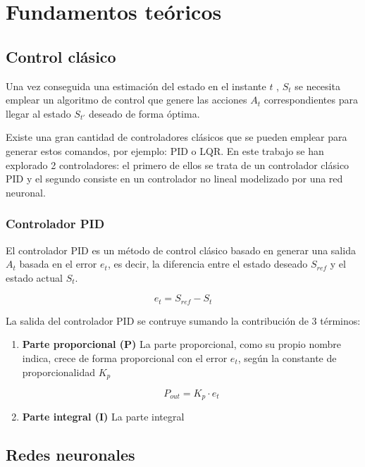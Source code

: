\chapter{Fundamentos teóricos}

\section{Control clásico}


Una vez conseguida una estimación del estado en el instante $t$ ,  $S_t$ se necesita emplear un algoritmo de control que genere	las acciones $A_t$ correspondientes para llegar al estado $S_{t'}$ deseado de forma óptima.




Existe una gran cantidad de controladores clásicos que se pueden emplear para generar estos comandos, por ejemplo: PID o LQR.
En este trabajo se han explorado 2 controladores: el primero de ellos se trata de un controlador clásico PID y el segundo consiste en un controlador no lineal modelizado por una red neuronal.

\subsection{Controlador PID}

El controlador PID es un método de control clásico basado en generar una salida $A_t$ basada en el error $e_t$, es decir, la diferencia entre el estado deseado $S_{ref}$ y el estado actual $S_t$.

\begin{equation}
e_t= S_{ref} - S_t
\end{equation}

La salida del controlador PID se contruye sumando la contribución de 3 términos:
\begin{enumerate}
	\item \textbf{Parte proporcional (P)}
	La parte proporcional, como su propio nombre indica, crece de forma proporcional con el error $e_t$, según la constante de proporcionalidad $K_p$
	
	\begin{equation}
	P_{out}=K_p \cdot e_t
	\end{equation} 
	\item \textbf{Parte integral (I)}
	La parte integral	
	
\end{enumerate}	


\section{Redes neuronales}

